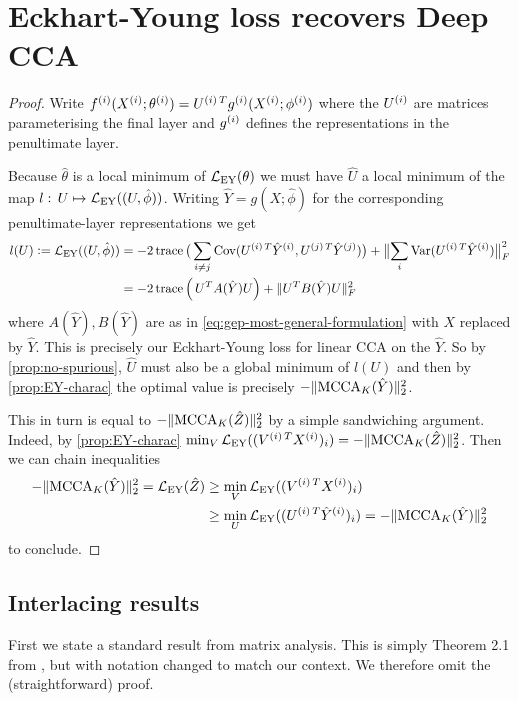 \section{Eckhart-Young loss recovers Deep CCA}\label{supp:EY-recover-Deep-CCA}
\recoverDeepCCA* %
\begin{proof}
    Write $f\sps{i}(X\sps{i}; \theta\sps{i}) = U\spsT{i} g\sps{i}(X\sps{i}; \phi\sps{i})$ where the $U\sps{i}$ are matrices parameterising the final layer and $g\sps{i}$ defines the representations in the penultimate layer.

    Because $\hat{\theta}$ is a local minimum of $\LEY(\theta)$ we must have $\hat{U}$ a local minimum of the map $l: \, U \mapsto \LEY((U, \hat{\phi}))$. Writing $\hat{Y} = g(X; \hat{\phi})$ for the corresponding penultimate-layer representations we get
    \begin{align*}
        l(U) \defeq \LEY((U, \hat{\phi}))
        &= - 2 \tr \big(\sum_{i \neq j} \Cov(U\spsT{i} \hat{Y}\sps{i}, U\spsT{j} \hat{Y}\sps{j}) \big) + \norm[\big]{\sum_i \Var(U\spsT{i} \hat{Y}\sps{i})}_F^2 \\
        &= - 2 \tr \left( \,U^T A(\hat{Y}) U\right)  + \norm{U^T B(\hat{Y}) U}^2_F
    \end{align*}
    where $A(\hat{Y}), B(\hat{Y})$ are as in \cref{eq:gep-most-general-formulation} with $X$ replaced by $\hat{Y}$.
    This is precisely our Eckhart-Young loss for linear CCA on the $\hat{Y}$.
    So by \cref{prop:no-spurious}, $\hat{U}$ must also be a global minimum of $l(U)$ and then by \cref{prop:EY-charac} the optimal value is precisely $- \norm{\MCCA_K(\hat{Y})}_2^2$.

    This in turn is equal to $- \norm{\MCCA_K(\hat{Z})}_2^2$ by a simple sandwiching argument.
    Indeed, by \cref{prop:EY-charac} $\min_V \LEY((V\spsT{i} X\sps{i})_i) = - \norm{\MCCA_K(\hat{Z})}_2^2$.
    Then we can chain inequalities
    \begin{align*}
        - \norm{\MCCA_K(\hat{Y})}_2^2 = \LEY(\hat{Z})
        &\geq \min_V \LEY((V\spsT{i} X\sps{i})_i) \\
        &\geq \min_U \LEY((U\spsT{i} \hat{Y}\sps{i})_i) = - \norm{\MCCA_K(\hat{Y})}_2^2
    \end{align*}
    to conclude.
\end{proof}

\subsection{Interlacing results}
First we state a standard result from matrix analysis.
This is simply Theorem 2.1 from \citet{haemers_interlacing_1995}, but with notation changed to match our context. We therefore omit the (straightforward) proof.

